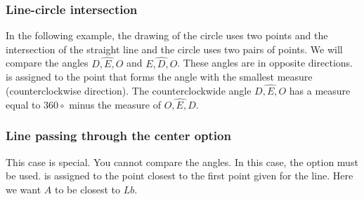 \subsubsection{Line-circle intersection}

In the following example, the drawing of the circle uses two points and the intersection of the straight line and the circle uses two pairs of points. We will compare the angles $\widehat{D,E,O}$ and $\widehat{E,D,O}$. These angles are in opposite directions.  is assigned to the point that forms the angle with the smallest measure (counterclockwise direction). The counterclockwide angle  $\widehat{D,E,O}$   has a measure equal to  $360\circ$ minus the measure of  $\widehat{O,E,D}$.

\begin{tkzexample}[latex=7cm,small]
\end{tkzexample}

\subsubsection{Line passing through the center option }
This case is special. You cannot compare the angles. In this case, the option  must be used.  is assigned to the point closest to the first point given for the line. Here we want $A$ to be closest to $Lb$.

\begin{tkzexample}[latex=7cm,small]
\end{tkzexample}

